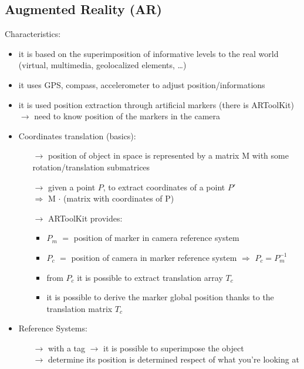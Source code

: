 \subsection{Augmented Reality (AR)}
Characteristics:
\begin{itemize}
    \item it is based on the superimposition of informative
    levels to the real world\\(virtual, multimedia, geolocalized elements, \dots)
    \item it uses GPS, compass, accelerometer to adjust position/informations
    \item it is used position extraction through artificial markers (there is ARToolKit)\\
    $\rightarrow$ need to know position of the markers in the camera
    \item Coordinates translation (basics):
    \begin{itemize}
        \item[$\rightarrow$] position of object in space is represented by a matrix M with some rotation/translation submatrices
        \item[$\rightarrow$] given a point $P$, to extract coordinates of a point $P'$\\
        $\Rightarrow$ M $\cdot$ (matrix with coordinates of P)
        \item[$\rightarrow$] ARToolKit provides:
        \begin{itemize}
            \item $P_m$ $=$ position of marker in camera reference system
            \item $P_c$ $=$ position of camera in marker reference system $\Rightarrow$ $P_c = P_m^{-1}$
            \item from $P_c$ it is possible to extract translation array $T_c$
            \item it is possible to derive the marker global position thanks to the\\
            translation matrix $T_c$
        \end{itemize}
    \end{itemize}
    \item Reference Systems:
    \begin{itemize}
        \item[$\rightarrow$] with a tag $\rightarrow$ it is possible to superimpose the object\\
        $\rightarrow$ determine its position is determined respect of what you're looking at

\end{itemize}
\end{itemize}
